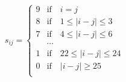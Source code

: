 \begin{eqnarray*}
s_{ij} = \left\{ \begin{array}{lcl}
9 & \text{if} & i = j \\
8 & \text{if} & 1 \le | i - j | \le 3 \\
7 & \text{if} & 4 \le | i - j | \le 6 \\
 & \cdots & \\
1 & \text{if} & 22 \le | i - j | \le 24 \\
0 & \text{if} & | i - j | \ge 25 \\
\end{array} \right.
\end{eqnarray*}
